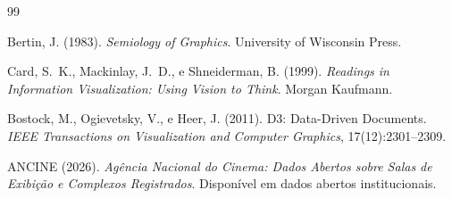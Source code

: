 \documentclass[12pt]{article}
\begin{document}
\begin{thebibliography}{99}

Bertin, J. (1983).
\newblock \textit{Semiology of Graphics}.
\newblock University of Wisconsin Press.

Card, S.~K., Mackinlay, J.~D., e Shneiderman, B. (1999).
\newblock \textit{Readings in Information Visualization: Using Vision to Think}.
\newblock Morgan Kaufmann.

Bostock, M., Ogievetsky, V., e Heer, J. (2011).
\newblock D3: Data-Driven Documents.
\newblock \textit{IEEE Transactions on Visualization and Computer Graphics}, 17(12):2301--2309.

ANCINE (2026).
\newblock \textit{Agência Nacional do Cinema: Dados Abertos sobre Salas de Exibição e Complexos Registrados}.
\newblock Disponível em dados abertos institucionais.

\end{thebibliography}
\end{document}
